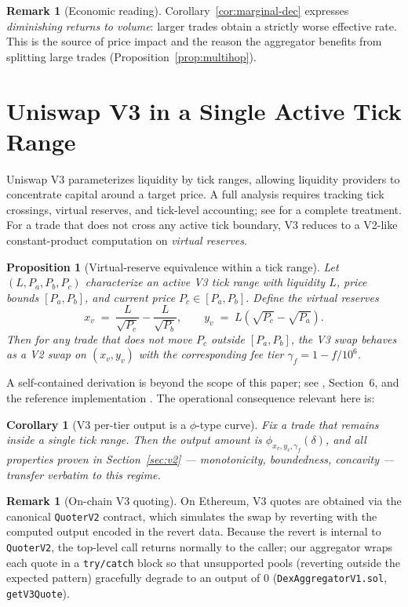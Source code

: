 \documentclass[11pt,a4paper]{article}
\newtheorem{proposition}[theorem]{Proposition}
\newtheorem{corollary}[theorem]{Corollary}
\theoremstyle{definition}
\newtheorem{remark}[theorem]{Remark}
\begin{document}
\begin{remark}[Economic reading]
Corollary~\ref{cor:marginal-dec} expresses \emph{diminishing returns to volume}:
larger trades obtain a strictly worse effective rate. This is the source of
price impact and the reason the aggregator benefits from splitting large trades
(Proposition~\ref{prop:multihop}).
\end{remark}

\section{Uniswap V3 in a Single Active Tick Range}
\label{sec:v3}

Uniswap V3 parameterizes liquidity by tick ranges, allowing liquidity providers
to concentrate capital around a target price. A full analysis requires tracking
tick crossings, virtual reserves, and tick-level accounting; see
\cite{uniswapv3} for a complete treatment. For a trade that does not cross any
active tick boundary, V3 reduces to a V2-like constant-product computation on
\emph{virtual reserves}.

\begin{proposition}[Virtual-reserve equivalence within a tick range]
\label{prop:v3-virtual}
Let $(L, P_a, P_b, P_c)$ characterize an active V3 tick range with liquidity $L$,
price bounds $[P_a, P_b]$, and current price $P_c \in [P_a, P_b]$. Define the
\emph{virtual reserves}
\[
    x_v \;=\; \frac{L}{\sqrt{P_c}} - \frac{L}{\sqrt{P_b}},
    \qquad
    y_v \;=\; L\!\left( \sqrt{P_c} - \sqrt{P_a} \right).
\]
Then for any trade that does not move $P_c$ outside $[P_a, P_b]$, the V3 swap
behaves as a V2 swap on $(x_v, y_v)$ with the corresponding fee tier
$\gamma_f = 1 - f/10^6$.
\end{proposition}

\noindent A self-contained derivation is beyond the scope of this paper; see
\cite{uniswapv3}, Section~6, and the reference implementation
\cite{uniswapv3core}. The operational consequence relevant here is:

\begin{corollary}[V3 per-tier output is a $\phi$-type curve]
\label{cor:v3-phi}
Fix a trade that remains inside a single tick range. Then the output amount is
$\phi_{x_v, y_v, \gamma_f}(\delta)$, and all properties proven in
Section~\ref{sec:v2} --- monotonicity, boundedness, concavity --- transfer
verbatim to this regime.
\end{corollary}

\begin{remark}[On-chain V3 quoting]
On Ethereum, V3 quotes are obtained via the canonical \texttt{QuoterV2} contract,
which simulates the swap by reverting with the computed output encoded in the
revert data. Because the revert is internal to \texttt{QuoterV2}, the top-level
call returns normally to the caller; our aggregator wraps each quote in a
\texttt{try/catch} block so that unsupported pools (reverting outside the
expected pattern) gracefully degrade to an output of $0$
(\texttt{DexAggregatorV1.sol}, \texttt{getV3Quote}).
\end{remark}
\end{document}
